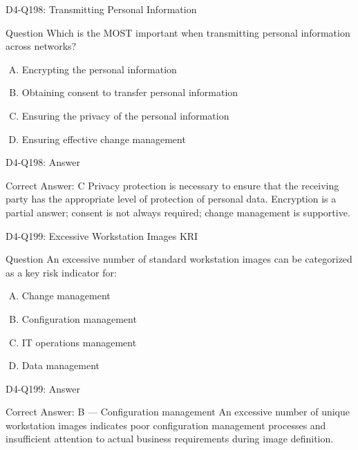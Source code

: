 \documentclass{beamer}
\begin{document}
	\begin{frame}{D4-Q198: Transmitting Personal Information}
		\begin{block}{Question}
			Which is the MOST important when transmitting personal information across networks?
		\end{block}
		\begin{enumerate}[(A)]
			\item Encrypting the personal information
			\item Obtaining consent to transfer personal information
			\item Ensuring the privacy of the personal information
			\item Ensuring effective change management
		\end{enumerate}
	\end{frame}
	\begin{frame}{D4-Q198: Answer}
		\begin{block}{Correct Answer: C}
			Privacy protection is necessary to ensure that the receiving party has the appropriate level of protection of personal data. Encryption is a partial answer; consent is not always required; change management is supportive.
		\end{block}
	\end{frame}
	
	\begin{frame}{D4-Q199: Excessive Workstation Images KRI}
		\begin{block}{Question}
			An excessive number of standard workstation images can be categorized as a key risk indicator for:
		\end{block}
		\begin{enumerate}[(A)]
			\item Change management
			\item Configuration management
			\item IT operations management
			\item Data management
		\end{enumerate}
	\end{frame}
	\begin{frame}{D4-Q199: Answer}
		\begin{block}{Correct Answer: B --- Configuration management}
			An excessive number of unique workstation images indicates poor configuration management processes and insufficient attention to actual business requirements during image definition.
		\end{block}
	\end{frame}
	
\end{document}
